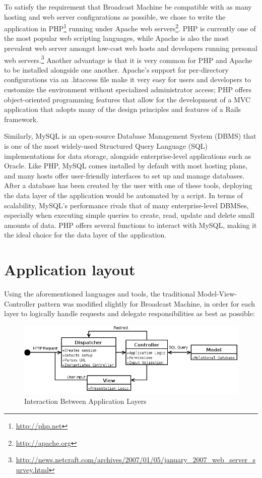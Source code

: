\documentclass[a4paper,12pt]{report}
\begin{document}
To satisfy the requirement that Broadcast Machine be compatible with as many hosting and web server configurations as possible, we chose to write the application in PHP\footnote{\url{http://php.net}} running under Apache web servers\footnote{\url{http://apache.org}}. PHP is currently one of the most popular web scripting languages, while Apache is also the most prevalent web server amongst low-cost web hosts and developers running personal web servers.\footnote{\url{http://news.netcraft.com/archives/2007/01/05/january\_2007\_web\_server\_survey.html}}
Another advantage is that it is very common for PHP and Apache to be installed alongside one another. Apache's support for per-directory configurations via an .htaccess file make it very easy for users and developers to customize the environment without specialized administrator access; PHP offers object-oriented programming features that allow for the development of a MVC application that adopts many of the design principles and features of a Rails framework.

Similarly, MySQL is an open-source Database Management System (DBMS) that is one of the most widely-used Structured Query Language (SQL) implementations for data storage, alongside enterprise-level applications such as Oracle. Like PHP, MySQL comes installed by default with most hosting plans, and many hosts offer user-friendly interfaces to set up and manage databases. After a database has been created by the user with one of these tools, deploying the data layer of the application would be automated by a script. In terms of scalability, MySQL's performance rivals that of many enterprise-level DBMSes, especially when executing simple queries to create, read, update and delete small amounts of data. PHP offers several functions to interact with MySQL, making it the ideal choice for the data layer of the application.

\section{Application layout}
Using the aforementioned languages and tools, the traditional Model-View-Controller pattern was modified slightly for Broadcast Machine, in order for each layer to logically handle requests and delegate responsibilities as best as possible:

\begin{figure}[h]
\begin{center}
\includegraphics[scale=0.5]{./images/flow.png}
\end{center}
\caption{Interaction Between Application Layers}
\end{figure}
\end{document}
